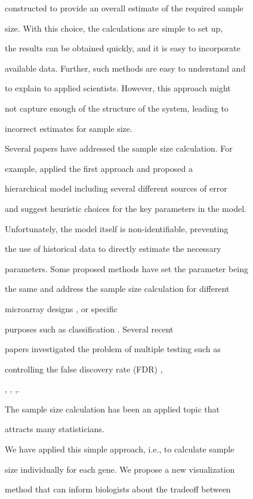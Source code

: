 \documentclass[12pt]{article}
\begin{document}
constructed to provide an overall estimate of the required sample

size.  With this choice, the calculations are simple to set up,

the results can be obtained quickly, and it is easy to incorporate

available data. Further, such methods are easy to understand and

to explain to applied scientists.  However, this approach might

not capture enough of the structure of the system, leading to

incorrect estimates for sample size.



Several papers have addressed the sample size calculation.  For

example, \citep{Zien03} applied the first approach and proposed a

hierarchical model including several different sources of error

and suggest heuristic choices for the key parameters in the model.

Unfortunately, the model itself is non-identifiable, preventing

the use of historical data to directly estimate the necessary

parameters.  Some proposed methods have set the parameter being

the same and address the sample size calculation for different

microarray designs \citep{Lee02}, \citep{Dobbin05} or specific

purposes such as classification \citep{Hua05}.  Several recent

papers investigated the problem of multiple testing such as

controlling the false discovery rate (FDR) \citep{Liu05},

\citep{Yang03}, \citep{Pawitan05}, \citep{Jung05},\citep{Hu05}.

The sample size calculation has been an applied topic that

attracts many statisticians.



We have applied this simple approach, i.e., to calculate sample

size individually for each gene.  We propose a new visualization

method that can inform biologists about the tradeoff between
\end{document}
